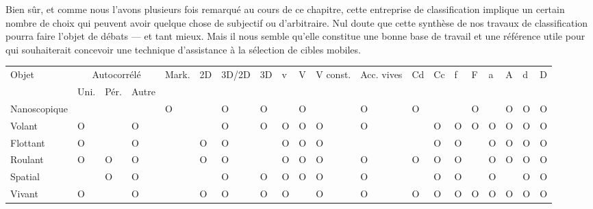 	Bien sûr, et comme nous l'avons plusieurs fois remarqué au cours de ce chapitre, cette entreprise de classification implique un certain nombre de choix qui peuvent avoir quelque chose de subjectif ou d'arbitraire. Nul doute que cette synthèse de nos travaux de classification pourra faire l'objet de débats --- et tant mieux. Mais il nous semble qu'elle constitue une bonne base de travail et une référence utile pour qui souhaiterait concevoir une technique d'assistance à la sélection de cibles mobiles.
	
	\begin{landscape}

	\begin{table}
		\centering
		\begin{adjustbox}{max width=\linewidth}
		\begin{tabular}{l|lll|l|l|l|l|l|l|l|l|l|l|l|l|l|l|l|l}
		Objet & \multicolumn{3}{c|}{Autocorrélé}                   & Mark. & 2D & 3D/2D & 3D & v & V & V const. & Acc. vives & Cd & Cc & f & F & a & A & d & D \\
    & Uni. & \multicolumn{1}{c}{Pér.} & Autre &         &    &       &    &   &   &          &            &           &           &   &   &   &   &   &  \bigstrut[b] \\ \hline
		Nanoscopique   &          &                                &       & O       &    & O     & O  &   & O &          & O          & O         &           &   & O &   & O & O & O \bigstrut[t] \\
		Volant         & O        &                                & O     &         &    & O     & O  & O & O & O        & O          &           & O         & O & O & O & O & O & O \\
		Flottant       & O        &                                & O     &         & O  & O     &    & O & O & O        &            &           & O         & O &   & O & O & O & O \\
		Roulant        & O        & O                              & O     &         & O  & O     &    & O & O & O        & O          & O         & O         & O &   & O & O & O & O \\
		Spatial        &          & O                              & O     &         &    & O     & O  & O & O & O        & O          &           & O         & O &   & O &   & O & O \\
		Vivant         & O        &                                & O     &         & O  & O     & O  & O &   & O        & O          & O         & O         & O & O & O & O & O & O \\

\end{tabular}
\end{adjustbox}
\end{table}
\end{landscape}
